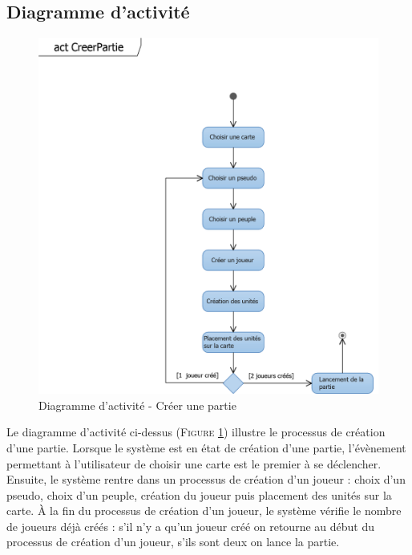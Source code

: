 \documentclass[a4paper,11pt]{article}
\begin{document}
	\subsection{Diagramme d'activité}
		\vspace*{0.5cm}
		\begin{figure}[ht!]
			\includegraphics{actCreerPartie.png}
			\caption{Diagramme d'activité - Créer une partie}
			\label{fig:actcreer}
		\end{figure}
		\vspace*{1cm}
		Le diagramme d'activité ci-dessus (\textsc{Figure \ref{fig:actcreer}}) illustre le processus de création d'une partie. Lorsque le système est en état de création d'une partie, l'évènement permettant à l'utilisateur de choisir une carte est le premier à se déclencher. Ensuite, le système rentre dans un processus de création d'un joueur : choix d'un pseudo, choix d'un peuple, création du joueur puis placement des unités sur la carte. À la fin du processus de création d'un joueur, le système vérifie le nombre de joueurs déjà créés : s'il n'y a qu'un joueur créé on retourne au début du processus de création d'un joueur, s'ils sont deux on lance la partie.
		\newpage
\end{document}
